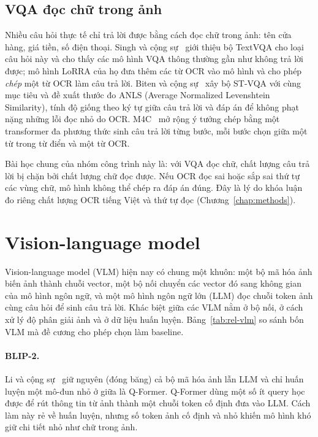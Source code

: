 \subsection{VQA đọc chữ trong ảnh}

Nhiều câu hỏi thực tế chỉ trả lời được bằng cách đọc chữ trong ảnh: tên cửa hàng,
giá tiền, số điện thoại. Singh và cộng sự~\cite{singh2019textvqa} giới thiệu bộ TextVQA cho
loại câu hỏi này và cho thấy các mô hình VQA thông thường gần như không trả lời
được; mô hình LoRRA của họ đưa thêm các từ OCR vào mô hình và cho phép
\emph{chép} một từ OCR làm câu trả lời. Biten và cộng sự~\cite{biten2019stvqa} xây bộ ST-VQA với
cùng mục tiêu và đề xuất thước đo ANLS (Average Normalized Levenshtein
Similarity), tính độ giống theo ký tự giữa câu trả lời và đáp án để không phạt
nặng những lỗi đọc nhỏ do OCR. M4C~\cite{hu2020m4c} mở rộng ý tưởng chép bằng một
transformer đa phương thức sinh câu trả lời từng bước, mỗi bước chọn giữa một từ
trong từ điển và một từ OCR.

Bài học chung của nhóm công trình này là: với VQA đọc chữ, chất lượng câu trả lời
bị chặn bởi chất lượng chữ đọc được. Nếu OCR đọc sai hoặc sắp sai thứ tự các vùng
chữ, mô hình không thể chép ra đáp án đúng. Đây là lý do khóa luận đo riêng chất
lượng OCR tiếng Việt và thứ tự đọc (Chương~\ref{chap:methods}).

\section{Vision-language model}
\label{sec:rel-vlm}

Vision-language model (VLM) hiện nay có chung một khuôn: một bộ mã hóa ảnh biến
ảnh thành chuỗi vector, một bộ nối chuyển các vector đó sang không gian của mô
hình ngôn ngữ, và một mô hình ngôn ngữ lớn (LLM) đọc chuỗi token ảnh cùng câu hỏi
để sinh câu trả lời. Khác biệt giữa các VLM nằm ở bộ nối, ở cách xử lý độ phân
giải ảnh và ở dữ liệu huấn luyện. Bảng~\ref{tab:rel-vlm} so sánh bốn VLM mà đề
cương cho phép chọn làm baseline.

\paragraph{BLIP-2.} Li và cộng sự~\cite{li2023blip2} giữ nguyên (đóng băng) cả bộ mã hóa ảnh
lẫn LLM và chỉ huấn luyện một mô-đun nhỏ ở giữa là Q-Former. Q-Former dùng một
số ít query học được để rút thông tin từ ảnh thành một chuỗi token cố định đưa
vào LLM. Cách làm này rẻ về huấn luyện, nhưng số token ảnh cố định và nhỏ khiến
mô hình khó giữ chi tiết nhỏ như chữ trong ảnh.

